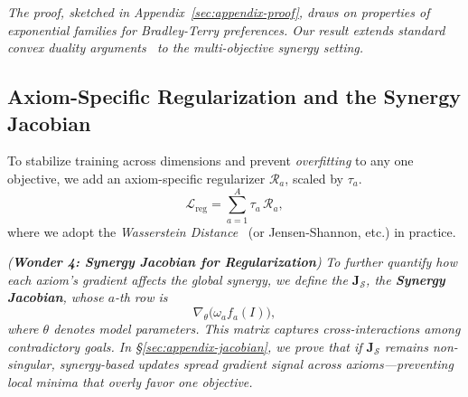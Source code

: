 \noindent
\emph{The proof, sketched in Appendix~\ref{sec:appendix-proof}, draws on properties of exponential families for Bradley-Terry preferences. Our result extends standard \emph{convex duality} arguments~\cite{boyd2004convex} to the multi-objective synergy setting.}

\subsection{Axiom-Specific Regularization and the Synergy Jacobian}
\label{sec:regularization-synergy-jacobian}

To stabilize training across dimensions and prevent \emph{overfitting} to any one objective, we add an axiom-specific regularizer \(\mathcal{R}_a\), scaled by \(\tau_a\).  
\[
\mathcal{L}_{\text{reg}}
= 
\sum_{a=1}^A
\tau_a
\,
\mathcal{R}_a,
\]
where we adopt the \emph{Wasserstein Distance}~\cite{arjovsky2017wasserstein} (or Jensen-Shannon, etc.) in practice.

\vspace{3pt}
\noindent
\textit{(\textbf{Wonder 4: Synergy Jacobian for Regularization})}\;
\emph{To further quantify how \emph{each axiom’s gradient} affects the global synergy, we define the \(\mathbf{J}_{\mathcal{S}}\), the \textbf{Synergy Jacobian}, whose \(a\)-th row is}
\[
\nabla_{\theta}
\bigl(\omega_a f_a(I)\bigr),
\]
\emph{where \(\theta\) denotes model parameters. This matrix captures \emph{cross-interactions} among contradictory goals. In \S\ref{sec:appendix-jacobian}, we prove that if \(\mathbf{J}_{\mathcal{S}}\) remains non-singular, synergy-based updates spread gradient signal across axioms—preventing local minima that overly favor one objective.}

